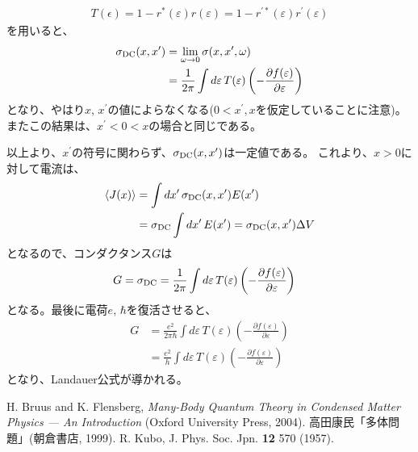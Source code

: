 \documentclass[10pt,a4j]{jarticle}
\begin{document}
\begin{align}
T(\epsilon) = 1-r^*(\varepsilon)r(\varepsilon)  = 1- r^{\prime*}(\varepsilon)r^\prime(\varepsilon) 
\end{align}
を用いると、
\begin{align}
\sigma_{{\rm DC}}(x,x^\prime) &= \lim_{\omega \rightarrow 0} \sigma(x,x^\prime,\omega) \nonumber \\
&=  \frac{1}{2\pi } \int d\varepsilon \, T(\varepsilon) \left( - \frac{\partial f(\varepsilon)}{\partial \varepsilon}\right) 
\end{align}
となり、やはり$x$, $x^\prime$の値によらなくなる($0 <x^\prime, x$を仮定していることに注意)。
またこの結果は、$x^\prime < 0 < x$の場合と同じである。

以上より、$x^\prime$の符号に関わらず、$\sigma_{{\rm DC}}(x,x^\prime)$は一定値である。
これより、$x>0$に対して電流は、
\begin{align}
\langle J(x)\rangle & = \int dx^\prime \, \sigma_{\rm DC}(x,x^\prime) E(x^\prime) \nonumber \\
& = \sigma_{\rm DC}  \int dx^\prime \, E(x^\prime) =  \sigma_{\rm DC}(x,x^\prime) \Delta V
\end{align}
となるので、コンダクタンス$G$は
\begin{align}
G & = \sigma_{\rm DC} 
=  \frac{1}{2\pi} \int d\varepsilon \, T(\varepsilon) \left( - \frac{\partial f(\varepsilon)}{\partial \varepsilon}\right)
\end{align}
となる。最後に電荷$e$, $\hbar$を復活させると、
\begin{align}
G &=  \frac{e^2}{2\pi \hbar} 
\int d\varepsilon \, T(\varepsilon) \left( - \frac{\partial f(\varepsilon)}{\partial \varepsilon}\right) \nonumber \\
&=  \frac{e^2}{h} \int d\varepsilon \, T(\varepsilon) \left( - \frac{\partial f(\varepsilon)}{\partial \varepsilon}\right)
\end{align}
となり、Landauer公式が導かれる。

\begin{thebibliography}{9}
 H. Bruus and K. Flensberg, {\it Many-Body Quantum Theory in Condensed
Matter Physics --- An Introduction} (Oxford University Press, 2004).
 高田康民「多体問題」(朝倉書店, 1999).
R. Kubo, J. Phys. Soc. Jpn. \textbf{12} 570 (1957).
\end{thebibliography}
\end{document}
